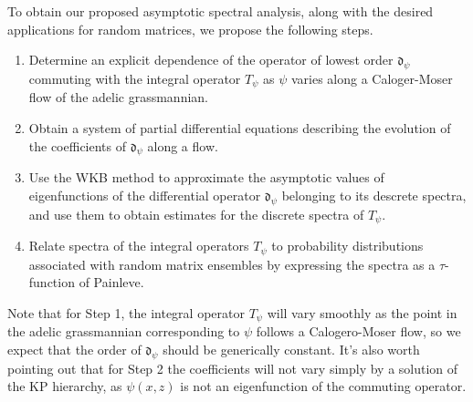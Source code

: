 \documentclass[11pt,letterpaper]{article}
\theoremstyle{definition}
\begin{document}
To obtain our proposed asymptotic spectral analysis, along with the desired applications for random matrices, we propose the following steps.
\begin{enumerate}[(Step 1):]
\item Determine an explicit dependence of the operator of lowest order $\mathfrak d_\psi$ commuting with the integral operator $T_\psi$ as $\psi$ varies along a Caloger-Moser flow of the adelic grassmannian.
\item Obtain a system of partial differential equations describing the evolution of the coefficients of $\mathfrak d_\psi$ along a flow.
\item Use the WKB method to approximate the asymptotic values of eigenfunctions of the differential operator $\mathfrak d_\psi$ belonging to its descrete spectra, and use them to obtain estimates for the discrete spectra of $T_\psi$.
\item Relate spectra of the integral operators $T_\psi$ to probability distributions associated with random matrix ensembles by expressing the spectra as a $\tau$-function of Painleve.
\end{enumerate}
Note that for Step 1, the integral operator $T_\psi$ will vary smoothly as the point in the adelic grassmannian corresponding to $\psi$ follows a Calogero-Moser flow, so we expect that the order of $\mathfrak d_\psi$ should be generically constant.
It's also worth pointing out that for Step 2 the coefficients will not vary simply by a solution of the KP hierarchy, as $\psi(x,z)$ is not an eigenfunction of the commuting operator.
\end{document}
